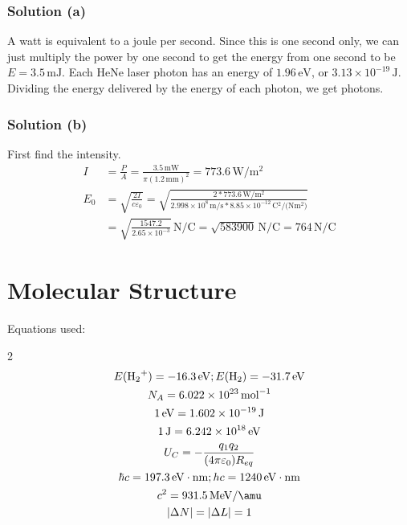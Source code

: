 \documentclass[12pt]{report}
\newcommand{\E}[1]{\times 10^{#1}}
\begin{document}
    \subsection{Solution (a)}
        A watt is equivalent to a joule per second.
        Since this is one second only, we can just multiply the power by one second to get the energy from one second to be $E = 3.5\,\unit{\milli\joule}$.
        Each HeNe laser photon has an energy of $1.96\,\unit{\eV}$, or $3.13\E{-19}\,\unit{\joule}$.
        Dividing the energy delivered by the energy of each photon, we get \boxed{1.11\E{16}} photons.
    
    \subsection{Solution (b)}
        First find the intensity.
        \begin{align}
            I   &=  \frac{P}{A} 
                =   \frac{3.5\,\unit{\milli\watt}}{\pi(1.2\,\unit{\milli\meter})^2}
                =   773.6\,\unit{\watt/\meter^2}\\
            E_0 &=  \sqrt{\frac{2I}{c\varepsilon_0}}
                =   \sqrt{\frac{2 * 773.6\,\unit{\watt/\meter^2}}{2.998\E{8}\,\unit{\meter/\second} * 8.85\E{-12}\,\unit{\coulomb^2/(\newton\meter^2)}}}\\
                &=  \sqrt{\frac{1547.2}{2.65\E{-3}}}\,\unit{\newton/\coulomb}
                =   \sqrt{583900}\,\unit{\newton/\coulomb}
                =   \boxed{764\,\unit{\newton/\coulomb}}
        \end{align}

\chapter{Molecular Structure}
Equations used:
\begin{multicols}{2}
    \scriptsize
    \begin{gather*}
        E(\ce{H2+}) = -16.3\,\unit{\eV};
        E(\ce{H2}) = -31.7\,\unit{\eV}\\
        N_A = 6.022\E{23}\,\unit{\mole^{-1}}\\
        1\,\unit{\eV} = 1.602\E{-19}\,\unit{\joule}\\
        1\,\unit{\joule} = 6.242\E{18}\,\unit{\eV}\\
        U_C = -\frac{q_1 q_2}{(4\pi\varepsilon_0)R_{eq}}\\
        \hbar c = 197.3\,\unit{\eV\cdot\nano\meter};
        hc = 1240\,\unit{\eV\cdot\nano\meter}\\
        c^2 = 931.5\,\unit{\mega\eV/\amu}\\
        \left| \Delta N \right| = \left| \Delta L \right| = 1
    \end{gather*}
    \normalsize
\end{multicols}
\pagebreak
\end{document}
